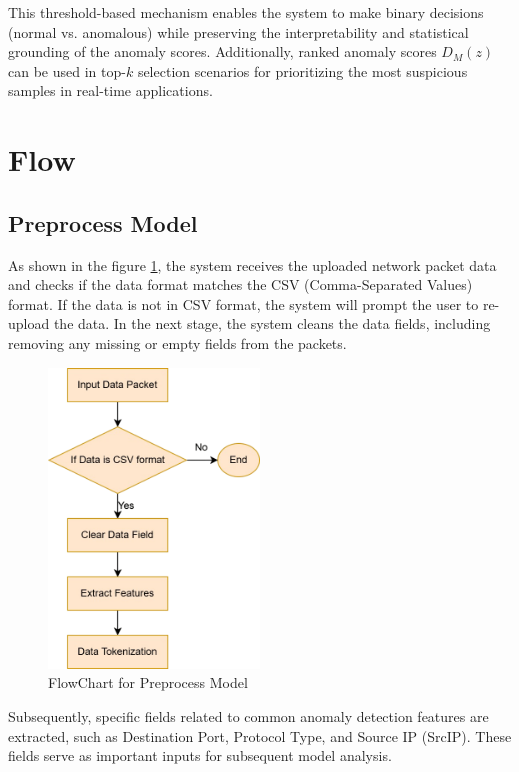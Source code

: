 \begin{ZhChapter}
This threshold-based mechanism enables the system to make binary decisions (normal vs. anomalous) while preserving the interpretability and statistical grounding of the anomaly scores. Additionally, ranked anomaly scores $D_M(z)$ can be used in top-$k$ selection scenarios for prioritizing the most suspicious samples in real-time applications.







\section{Flow} %
\subsection{Preprocess Model}
As shown in the figure \ref{fig:FlowChart}, the system receives the uploaded network packet data and checks if the data format matches the CSV (Comma-Separated Values) format. If the data is not in CSV format, the system will prompt the user to re-upload the data. In the next stage, the system cleans the data fields, including removing any missing or empty fields from the packets.
\begin{figure}[htbp]
    \centering
    \includegraphics[width = 0.5\textwidth]{image/FlowChart.jpg}
    \caption{FlowChart for Preprocess Model}
    \label{fig:FlowChart}
\end{figure}

Subsequently, specific fields related to common anomaly detection features are extracted, such as Destination Port, Protocol Type, and Source IP (SrcIP). These fields serve as important inputs for subsequent model analysis.


\end{ZhChapter}
